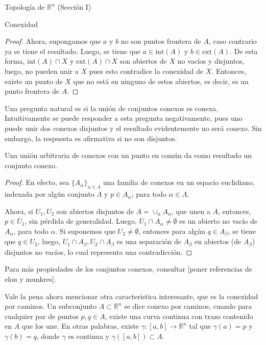\begin{chapter}{Topología de $\mathbb{R}^n$ (Sección I)}
\begin{section}{Conexidad}
\begin{proof}
Ahora, supongamos que $a$ y $b$ no son puntos frontera de $A$, caso contrario ya se tiene el resultado. Luego, se tiene que $a \in \text{int}(A)$ y $b \in \text{ext}(A)$. De esta forma, $\text{int}(A) \cap X$ y $\text{ext}(A) \cap X$ son abiertos de $X$ no vacíos y disjuntos, luego, no pueden unir a $X$ pues esto contradice la conexidad de $X$. Entonces, existe un punto de $X$ que no está en ninguno de estos abiertos, es decir, es un punto frontera de $A$.
\end{proof}

Una pregunta natural es si la unión de conjuntos conexos es conexa. Intuitivamente se puede responder a esta pregunta negativamente, pues uno puede unir dos conexos disjuntos y el resultado evidentemente no será conexo. Sin embargo, la respuesta es afirmativa si no son disjuntos.

\begin{them}

Una unión arbitraria de conexos con un punto en común da como resultado un conjunto conexo.

\end{them}

\begin{proof}

En efecto, sea $\{ A_{\alpha} \}_{\alpha \in \Lambda}$ una familia de conexos en un espacio euclidiano, indexada por algún conjunto $\Lambda$ y $p \in A_{\alpha}$, para todo $\alpha \in \Lambda$.

Ahora, si $U_1, U_2$ son abiertos disjuntos de $A = \cup_{\alpha} A_{\alpha}$, que unen a $A$, entonces, $p \in U_1$, sin pérdida de generalidad. Luego, $U_1 \cap A_{\alpha} \neq \emptyset$ es un abierto no vacío de $A_{\alpha}$, para todo $\alpha$. Si suponemos que $U_2 \neq \emptyset$, entonces para algún $q \in A_{\beta}$, se tiene que $q \in U_2$, luego, $U_1 \cap A_{\beta}, U_2 \cap A_{\beta}$ es una separación de $A_{\beta}$ en abiertos (de $A_{\beta}$) disjuntos no vacíos, lo cual representa una contradicción.

\end{proof}

Para más propiedades de los conjuntos conexos, consultar [poner referencias de elon y munkres].

Vale la pena ahora mencionar otra caracteristica interesante, que es la conexidad por caminos. Un subconjunto $A \subset \mathbb{R}^n$ se dice conexo por caminos, cuando para cualquier par de puntos $p, q \in A$, existe una curva continua con trazo contenido en $A$ que los une. En otras palabras, existe $\gamma: [a,b] \to \mathbb{R}^n$ tal que $\gamma(a) = p$ y $\gamma(b) = q$, donde $\gamma$ es continua y $\gamma([a,b])\subset A$.


\end{section}
\end{chapter}

